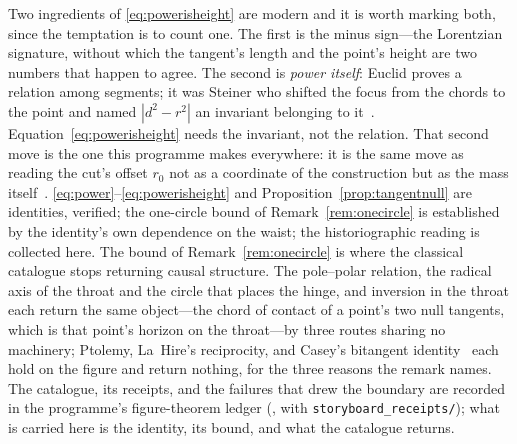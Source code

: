 \documentclass[11pt,a4paper]{article}
\theoremstyle{definition}
\begin{document}
Two ingredients of \eqref{eq:powerisheight} are modern and it is worth marking
both, since the temptation is to count one. The first is the minus sign---the
Lorentzian signature, without which the tangent's length and the point's height
are two numbers that happen to agree. The second is \emph{power itself}: Euclid
proves a relation among segments; it was Steiner who shifted the focus from the
chords to the point and named $|d^{2}-r^{2}|$ an invariant belonging to
it~\cite{Steiner1826}. Equation~\eqref{eq:powerisheight} needs the invariant, not
the relation. That second move is the one this programme makes everywhere: it is
the same move as reading the cut's offset $r_{0}$ not as a coordinate of the
construction but as the mass itself~\cite{JanzenSlicing,JanzenOperator}.
\eqref{eq:power}--\eqref{eq:powerisheight} and
Proposition~\ref{prop:tangentnull} are identities, verified; the
one-circle bound of Remark~\ref{rem:onecircle} is established by the
identity's own dependence on the waist; the historiographic reading is
collected here. The bound of Remark~\ref{rem:onecircle} is where the classical catalogue stops returning causal structure. The pole--polar relation, the radical
axis of the throat and the circle that places the hinge, and inversion in the throat
each return the same object---the chord of contact of a point's two null tangents,
which is that point's horizon on the throat---by three routes sharing no machinery;
Ptolemy, La~Hire's reciprocity, and Casey's bitangent identity~\cite{CoxeterGreitzer1967,Coxeter1987b,Casey1866} each hold on the
figure and return nothing, for the three reasons the remark names. The catalogue,
its receipts, and the failures that drew the boundary are recorded in the
programme's figure-theorem ledger (, with
\texttt{storyboard\_receipts/}); what is carried here is the identity, its bound, and what the catalogue returns.
\end{document}
